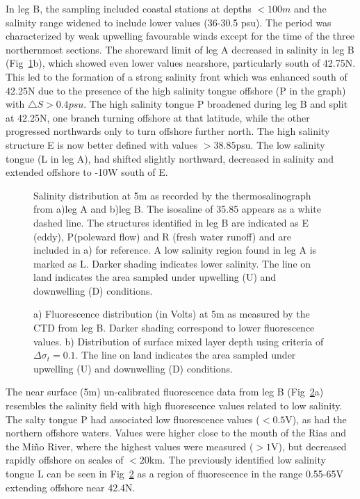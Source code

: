 In leg B, the sampling included coastal stations at depths $<100m$
and the salinity range widened to include lower values (36-30.5
psu). The period was characterized by weak upwelling favourable
winds except for the time of the three northernmost sections. The
shoreward limit of leg A decreased in salinity in leg B
(Fig~\ref{fig:cd105ths}b), which showed even lower values
nearshore, particularly south of 42.75\deg N. This led to the
formation of a strong salinity front which was enhanced south of
42.25\deg N due to the presence of the high salinity tongue
offshore (P in the graph) with $\triangle S>0.4psu$. The high
salinity tongue P broadened during leg B and split at 42.25\deg N,
one branch turning offshore at that latitude, while the other
progressed northwards only to turn offshore further north. The
high salinity structure E is now better defined with values
$>38.85$psu. The low salinity tongue (L in leg A), had shifted
slightly northward, decreased in salinity and extended offshore to
-10\deg W south of E.
\begin{figure}[h]
\centering {}%
\caption{Salinity distribution at 5m as recorded by the
thermosalinograph from a)leg A and b)leg B. The isosaline of 35.85
appears as a white dashed line. The structures identified in leg B
are indicated as E (eddy), P(poleward flow) and R (fresh water
runoff) and are included in a) for reference. A low salinity
region found in leg A is marked as L. Darker shading indicates
lower salinity. The line on land indicates the area sampled under
upwelling (U) and downwelling (D) conditions. }
\label{fig:cd105ths}\end{figure}
\begin{figure}[ht]
\centering {}
\caption{a) Fluorescence distribution (in Volts) at 5m as measured
by the CTD from leg B. Darker shading correspond to lower
fluorescence values. b) Distribution of surface mixed layer depth
using criteria of $\Delta \sigma_{t}=0.1$\dens. The line on land
indicates the area sampled under upwelling (U) and downwelling (D)
conditions.}\label{fig:cd105chl5m}
\end{figure}

The near surface (5m) un-calibrated fluorescence data from leg B
(Fig~\ref{fig:cd105chl5m}a) resembles the salinity field with high
fluorescence values related to low salinity. The salty tongue P
had associated low fluorescence values ($<0.5$V), as had the
northern offshore waters. Values were higher close to the mouth of
the Rias and the Mi\~{n}o River, where the highest values were
measured ($>1$V), but  decreased rapidly offshore on scales of
$<20$km. The previously identified low salinity tongue L can be
seen in Fig~\ref{fig:cd105chl5m} as a region of fluorescence in
the range 0.55-65V extending offshore near 42.4\deg N.

